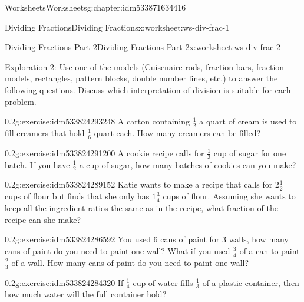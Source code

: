 \documentclass[twoside,11pt,]{book}
\begin{document}
\begin{chapterptx}{Worksheets}{}{Worksheets}{}{}{g:chapter:idm533871634416}
\begin{worksheet-section-numberless}{Dividing Fractions}{}{Dividing Fractions}{}{}{x:worksheet:ws-div-frac-1}
\end{worksheet-section-numberless}
\restoregeometry
%
%
\typeout{************************************************}
\typeout{************************************************}
%
\begin{worksheet-section-numberless}{Dividing Fractions Part 2}{}{Dividing Fractions Part 2}{}{}{x:worksheet:ws-div-frac-2}
\begin{introduction}{}%
Exploration 2: Use one of the models (Cuisenaire rods, fraction bars, fraction models, rectangles, pattern blocks, double number lines, etc.) to answer the following questions. Discuss which interpretation of division is suitable for each problem.%
\end{introduction}%
\begin{divisionexercise}{1}{}{0.2}{g:exercise:idm533824293248}%
A carton containing \(\frac{1}{2} \)  a quart of cream is used to fill creamers that hold \(\frac{1}{6} \)  quart each.  How many creamers can be filled?%
\end{divisionexercise}%
\begin{divisionexercise}{2}{}{0.2}{g:exercise:idm533824291200}%
A cookie recipe calls for \(\frac{1}{3} \) cup of sugar for one batch.  If you have \(\frac{1}{2} \) a cup of sugar, how many batches of cookies can you make?%
\end{divisionexercise}%
\begin{divisionexercise}{3}{}{0.2}{g:exercise:idm533824289152}%
Katie wants to make a recipe that calls for \(2 \frac{1}{2} \) cups of flour but finds that she only has \(1 \frac{3}{4} \) cups of flour. Assuming she wants to keep all the ingredient ratios the same as in the recipe, what fraction of the recipe can she make?%
\end{divisionexercise}%
\clearpage
\begin{divisionexercise}{4}{}{0.2}{g:exercise:idm533824286592}%
You used 6 cans of paint for 3 walls, how many cans of paint do you need to paint one wall?  What if you used \(\frac{3}{4} \) of a can to paint \(\frac{2}{3} \) of a wall. How many cans of paint do you need to paint one wall?%
\end{divisionexercise}%
\begin{divisionexercise}{5}{}{0.2}{g:exercise:idm533824284320}%
If \(\frac{1}{4} \)  cup of water fills \(\frac{1}{3} \)  of a plastic container, then how much water will the full container hold?%
\end{divisionexercise}%

\end{worksheet-section-numberless}
\end{chapterptx}
\end{document}
